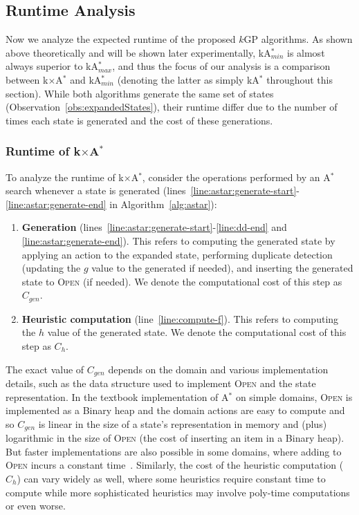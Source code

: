 \documentclass{aicom2e}
\newcommand{\kgs}{$k$GP}
\newcommand{\astar}{A$^*$}
\newcommand{\kastar}{kA$^*$}
\newcommand{\kastarmin}{kA$^*_{min}$}
\newcommand{\kastarmax}{kA$^*_{max}$}
\newcommand{\kxastar}{k$\times$A$^*$}
\newcommand{\open}{\textsc{Open}}
\begin{document}
\subsection{Runtime Analysis}

Now we analyze the expected runtime of the proposed \kgs{} algorithms. As shown
above theoretically and will be shown later experimentally, \kastarmin{} is
almost always superior to \kastarmax{}, and thus the focus of our analysis is a
comparison between \kxastar{} and \kastarmin{} (denoting the latter as simply \kastar{} throughout this section).  While both algorithms generate
the same set of states (Observation~\ref{obs:expandedStates}), their runtime
differ due to the number of times each state is generated and the cost of these
generations.



\subsubsection{Runtime of \kxastar{}}
To analyze the runtime of \kxastar{}, consider the operations performed by an \astar{} search whenever a state is generated (lines~\ref{line:astar:generate-start}-\ref{line:astar:generate-end} in
Algorithm~\ref{alg:astar}):

\begin{enumerate}
    \item {\bf Generation}  (lines~\ref{line:astar:generate-start}-\ref{line:dd-end} and \ref{line:astar:generate-end}).
    This refers to computing the generated state by applying an action to the expanded state,
    performing duplicate detection (updating the $g$ value to the generated if needed),
    and inserting the generated state to \open{} (if needed).
    We denote the computational cost of this step as $C_{gen}$.


    \item {\bf Heuristic computation}  (line~\ref{line:compute-f}). This refers to computing the $h$ value of the generated state.
    We denote the computational cost of this step as $C_{h}$.
\end{enumerate}

The exact value of $C_{gen}$ depends on the domain and various implementation
details, such as the data structure used to implement \open{} and the state
representation. In the textbook implementation of \astar{} on simple domains,
\open{} is implemented as a Binary heap and the domain actions are easy to
compute and so $C_{gen}$ is linear in the size  of a state's representation in
memory and (plus) logarithmic in the size of \open{} (the cost of inserting an
item in a Binary heap). But faster implementations are also possible in some
domains, where adding to \open{} incurs a constant
time~\cite{GILON2016,BurnsHLR12}. Similarly, the cost of the heuristic
computation ($C_h$) can vary widely as well, where some heuristics require
constant time to compute while more sophisticated heuristics may involve
poly-time computations or even worse.
\end{document}
